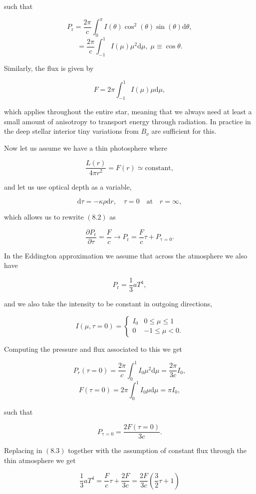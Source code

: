 \documentclass[twocolumn]{article}
\begin{document}
such that

\[P_\mathrm{r}=\frac{2\pi}{c}\int_0^\pi I(\theta)\cos^2(\theta)\sin(\theta)\mathrm{d}\theta,\]
\[=\frac{2\pi}{c}\int_{-1}^1I(\mu)\mu^2\mathrm{d}\mu,\;\mu\equiv\cos\theta.\]

Similarly, the flux is given by

\[F=2\pi\int_{-1}^1 I(\mu)\mu \mathrm{d}\mu,\]

which applies throughout the entire star, meaning that we always need at
least a small amount of anisotropy to transport energy through
radiation. In practice in the deep stellar interior tiny variations from
\(B_\nu\) are sufficient for this.

Now let us assume we have a thin photosphere where

\[\frac{L(r)}{4\pi r^2}=F(r)\simeq \mathrm{constant},\]

and let us use optical depth as a variable,

\[\mathrm{d}\tau=-\kappa\rho\mathrm{d}r,\quad \tau=0\quad \mathrm{at}\quad r=\infty,\]

which allows us to rewrite \((8.2)\) as

\[\frac{\partial P_\mathrm{r}}{\partial\tau}=\frac{F}{c}\rightarrow P_\mathrm{r}=\frac{F}{c}\tau+P_\mathrm{\tau=0}.\tag{8.3}\]

In the Eddington approximation we assume that across the atmosphere we
also have

\[P_\mathrm{r}=\frac{1}{3}aT^4,\]

and we also take the intensity to be constant in outgoing directions,

\[I(\mu,\tau=0)=\begin{cases}I_0 & 0\leq \mu \leq 1 \\ 0 & -1 \leq \mu < 0.\end{cases}\]

Computing the pressure and flux associated to this we get

\[P_r(\tau=0)=\frac{2\pi}{c}\int_0^1I_0\mu^2\mathrm{d}\mu=\frac{2\pi}{3c}I_0,\]
\[F(\tau=0)=2\pi\int_0^1I_0\mu\mathrm{d}\mu=\pi I_0,\]

such that

\[P_\mathrm{\tau=0}=\frac{2F(\tau=0)}{3c}.\]

Replacing in \((8.3)\) together with the assumption of constant flux
through the thin atmosphere we get

\[\frac{1}{3}aT^4=\frac{F}{c}\tau +\frac{2F}{3c}=\frac{2F}{3c}\left(\frac{3}{2}\tau + 1\right)\]
\end{document}

